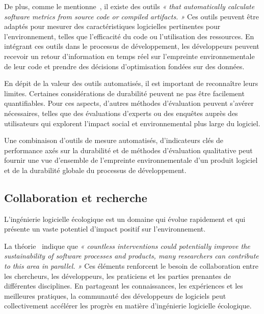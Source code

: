 De plus, comme le mentionne~\cite{GreenSoftModel}, il existe des outils \emph{« that automatically calculate software metrics from source code or compiled artifacts. »}  Ces outils peuvent être adaptés pour mesurer des caractéristiques logicielles pertinentes pour l'environnement, telles que l'efficacité du code ou l'utilisation des ressources. En intégrant ces outils dans le processus de développement, les développeurs peuvent recevoir un retour d'information en temps réel sur l'empreinte environnementale de leur code et prendre des décisions d'optimisation fondées sur des données.


En dépit de la valeur des outils automatisés, il est important de reconnaître leurs limites.  Certaines considérations de durabilité peuvent ne pas être facilement quantifiables.  Pour ces aspects, d'autres méthodes d'évaluation peuvent s'avérer nécessaires, telles que des évaluations d'experts ou des enquêtes auprès des utilisateurs qui explorent l'impact social et environnemental plus large du logiciel.


Une combinaison d'outils de mesure automatisés, d'indicateurs clés de performance axés sur la durabilité et de méthodes d'évaluation qualitative peut fournir une vue d'ensemble de l'empreinte environnementale d'un produit logiciel et de la durabilité globale du processus de développement. 


\subsection{Collaboration et recherche}
L'ingénierie logicielle écologique est un domaine qui évolue rapidement et qui présente un vaste potentiel d'impact positif sur l'environnement.


La théorie~\cite{SustainableStratifiedTheory} indique que \emph{« countless interventions could potentially improve the sustainability of software processes and products, many researchers can contribute to this area in parallel. »} Ces éléments renforcent le besoin de collaboration entre les chercheurs, les développeurs, les praticiens et les parties prenantes de différentes disciplines. En partageant les connaissances, les expériences et les meilleures pratiques, la communauté des développeurs de logiciels peut collectivement accélérer les progrès en matière d'ingénierie logicielle écologique.


